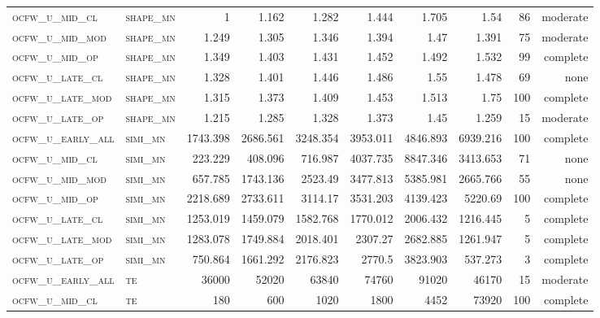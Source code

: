\begin{landscape}
\begin{center}
\begin{footnotesize}
\begin{longtable}{llrrrrr|rrr}
\textsc{ocfw\_u\_mid\_cl   } & \textsc{shape\_mn }    & 1        & 1.162    & 1.282    & 1.444    & 1.705    & 1.54     & 86  & moderate \\
\textsc{ocfw\_u\_mid\_mod  } & \textsc{shape\_mn }    & 1.249    & 1.305    & 1.346    & 1.394    & 1.47     & 1.391    & 75  & moderate \\
\textsc{ocfw\_u\_mid\_op   } & \textsc{shape\_mn }    & 1.349    & 1.403    & 1.431    & 1.452    & 1.492    & 1.532    & 99  & complete \\
\textsc{ocfw\_u\_late\_cl  } & \textsc{shape\_mn }    & 1.328    & 1.401    & 1.446    & 1.486    & 1.55     & 1.478    & 69  & none     \\
\textsc{ocfw\_u\_late\_mod } & \textsc{shape\_mn }    & 1.315    & 1.373    & 1.409    & 1.453    & 1.513    & 1.75     & 100 & complete \\
\textsc{ocfw\_u\_late\_op  } & \textsc{shape\_mn }    & 1.215    & 1.285    & 1.328    & 1.373    & 1.45     & 1.259    & 15  & moderate \\
\textsc{ocfw\_u\_early\_all} & \textsc{simi\_mn  }    & 1743.398 & 2686.561 & 3248.354 & 3953.011 & 4846.893 & 6939.216 & 100 & complete \\
\textsc{ocfw\_u\_mid\_cl   } & \textsc{simi\_mn  }    & 223.229  & 408.096  & 716.987  & 4037.735 & 8847.346 & 3413.653 & 71  & none     \\
\textsc{ocfw\_u\_mid\_mod  } & \textsc{simi\_mn  }    & 657.785  & 1743.136 & 2523.49  & 3477.813 & 5385.981 & 2665.766 & 55  & none     \\
\textsc{ocfw\_u\_mid\_op   } & \textsc{simi\_mn  }    & 2218.689 & 2733.611 & 3114.17  & 3531.203 & 4139.423 & 5220.69  & 100 & complete \\
\textsc{ocfw\_u\_late\_cl  } & \textsc{simi\_mn  }    & 1253.019 & 1459.079 & 1582.768 & 1770.012 & 2006.432 & 1216.445 & 5   & complete \\
\textsc{ocfw\_u\_late\_mod } & \textsc{simi\_mn  }    & 1283.078 & 1749.884 & 2018.401 & 2307.27  & 2682.885 & 1261.947 & 5   & complete \\
\textsc{ocfw\_u\_late\_op  } & \textsc{simi\_mn  }    & 750.864  & 1661.292 & 2176.823 & 2770.5   & 3823.903 & 537.273  & 3   & complete \\
\textsc{ocfw\_u\_early\_all} & \textsc{te  	     }    & 36000    & 52020    & 63840    & 74760    & 91020    & 46170    & 15  & moderate \\
\textsc{ocfw\_u\_mid\_cl   } & \textsc{te        }    & 180      & 600      & 1020     & 1800     & 4452     & 73920    & 100 & complete \\

\end{longtable}
\end{footnotesize}
\end{center}
\end{landscape}

